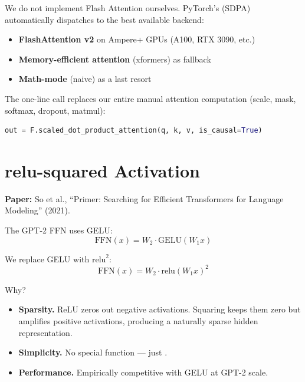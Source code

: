 We do not implement Flash Attention ourselves.  PyTorch's  (SDPA) automatically dispatches to the best available backend:
\begin{itemize}
  \item \textbf{FlashAttention v2} on Ampere+ GPUs (A100, RTX 3090, etc.)
  \item \textbf{Memory-efficient attention} (xformers) as fallback
  \item \textbf{Math-mode} (naive) as a last resort
\end{itemize}

The one-line call replaces our entire manual attention computation (scale, mask, softmax, dropout, matmul):
\begin{lstlisting}[language=Python]
out = F.scaled_dot_product_attention(q, k, v, is_causal=True)
\end{lstlisting}



\section{relu-squared Activation}

\textbf{Paper:} So et al., ``Primer: Searching for Efficient Transformers for Language Modeling'' (2021).

The GPT-2 FFN uses GELU:
\[
  \text{FFN}(x) = W_2 \cdot \text{GELU}(W_1 x)
\]

We replace GELU with $\text{relu}^2$:
\[
  \text{FFN}(x) = W_2 \cdot \text{relu}(W_1 x)^2
\]

Why?
\begin{itemize}
  \item \textbf{Sparsity.}  ReLU zeros out negative activations.  Squaring keeps them zero but amplifies positive activations, producing a naturally sparse hidden representation.
  \item \textbf{Simplicity.}  No special function --- just .
  \item \textbf{Performance.}  Empirically competitive with GELU at GPT-2 scale.
\end{itemize}

